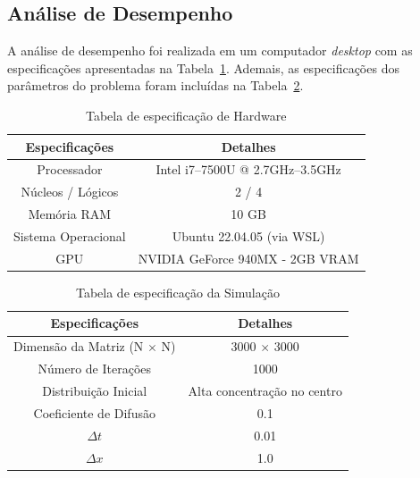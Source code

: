 \documentclass[12pt]{article}
\begin{document}
\subsection{Análise de Desempenho}

A análise de desempenho foi realizada em um computador \textit{desktop} com as
especificações apresentadas na Tabela~\ref{tab:especificacaoHardware}. Ademais,
as especificações dos parâmetros do problema foram incluídas na
Tabela~\ref{tab:especificacaoSimulacao}.

\begin{table}[ht]
  \centering
  \caption{Tabela de especificação de Hardware}
  \vspace{0.3cm}
  \begin{tabular}{||c c||}
    \hline
    Especificações      & Detalhes                         \\ [0.5ex]
    \hline\hline
    Processador         & Intel i7--7500U @ 2.7GHz--3.5GHz \\
    \hline
    Núcleos / Lógicos   & 2 / 4                            \\
    \hline
    Memória RAM         & 10 GB                            \\
    \hline
    Sistema Operacional & Ubuntu 22.04.05 (via WSL)        \\
    \hline
    GPU                 & NVIDIA GeForce 940MX - 2GB VRAM  \\
    \hline
  \end{tabular}\label{tab:especificacaoHardware}
\end{table}

\begin{table}[ht]
  \centering
  \caption{Tabela de especificação da Simulação}
  \vspace{0.3cm}
  \begin{tabular}{||c c||}
    \hline
    Especificações                    & Detalhes                    \\ [0.5ex]
    \hline\hline
    Dimensão da Matriz (N $\times$ N) & 3000 $\times$ 3000          \\
    \hline
    Número de Iterações               & 1000                        \\
    \hline
    Distribuição Inicial              & Alta concentração no centro \\
    \hline
    Coeficiente de Difusão            & 0.1                         \\
    \hline
    $\Delta t$                        & 0.01                        \\
    \hline
    $\Delta x$                        & 1.0                         \\
    \hline
  \end{tabular}\label{tab:especificacaoSimulacao}
\end{table}
\end{document}
